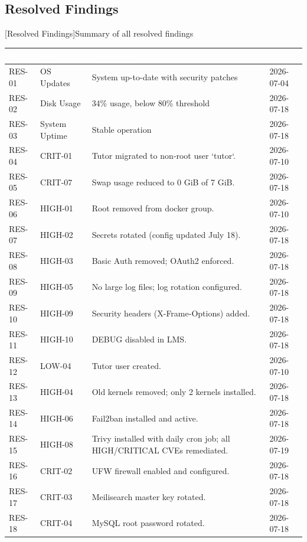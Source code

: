 \subsection{Resolved Findings}
\begin{center}
[Resolved Findings]{Summary of all resolved findings}
\label{tab:resolved}
\begin{tabular}{|p{}|p{}|p{}|p{}|}
\hline
\rowcolor{mooveblue}
\textcolor{white}{\textbf{ID}} & \textcolor{white}{\textbf{Finding}} & \textcolor{white}{\textbf{Resolution}} & \textcolor{white}{} \\
\hline
RES-01 & OS Updates & System up-to-date with security patches & 2026-07-04 \\
RES-02 & Disk Usage & 34\% usage, below 80\% threshold & 2026-07-18 \\
RES-03 & System Uptime & Stable operation & 2026-07-18 \\
RES-04 & CRIT-01 & Tutor migrated to non‑root user `tutor`. & 2026-07-10 \\
RES-05 & CRIT-07 & Swap usage reduced to 0 GiB of 7 GiB. & 2026-07-18 \\
RES-06 & HIGH-01 & Root removed from docker group. & 2026-07-10 \\
RES-07 & HIGH-02 & Secrets rotated (config updated July 18). & 2026-07-18 \\
RES-08 & HIGH-03 & Basic Auth removed; OAuth2 enforced. & 2026-07-18 \\
RES-09 & HIGH-05 & No large log files; log rotation configured. & 2026-07-18 \\
RES-10 & HIGH-09 & Security headers (X-Frame-Options) added. & 2026-07-18 \\
RES-11 & HIGH-10 & DEBUG disabled in LMS. & 2026-07-18 \\
RES-12 & LOW-04 & Tutor user created. & 2026-07-10 \\
RES-13 & HIGH-04 & Old kernels removed; only 2 kernels installed. & 2026-07-18 \\
RES-14 & HIGH-06 & Fail2ban installed and active. & 2026-07-18 \\
RES-15 & HIGH-08 & Trivy installed with daily cron job; all HIGH/CRITICAL CVEs remediated. & 2026-07-19 \\
RES-16 & CRIT-02 & UFW firewall enabled and configured. & 2026-07-18 \\
RES-17 & CRIT-03 & Meilisearch master key rotated. & 2026-07-18 \\
RES-18 & CRIT-04 & MySQL root password rotated. & 2026-07-18 \\

\end{tabular}
\end{center}
